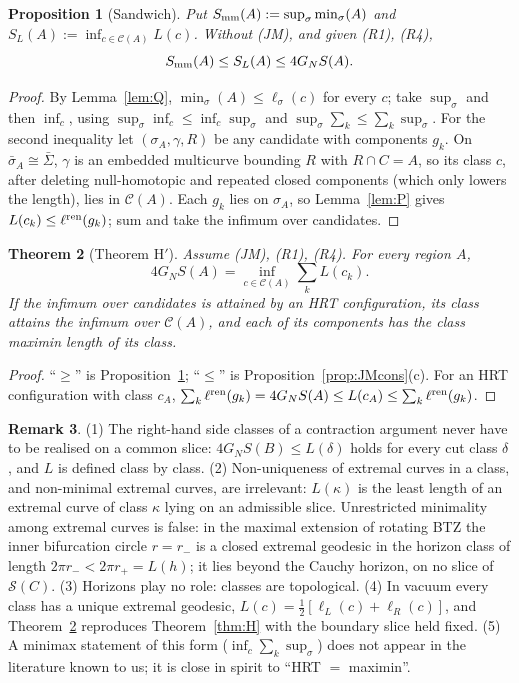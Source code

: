 \documentclass[aps,prd,onecolumn,superscriptaddress,nofootinbib,amsmath,amssymb,11pt]{revtex4-2}
\newtheorem{theorem}{Theorem}[section]
\newtheorem{proposition}[theorem]{Proposition}
\theoremstyle{definition}
\newtheorem{remark}[theorem]{Remark}
\newcommand{\Cut}{\mathcal{C}}
\begin{document}
\begin{proposition}[Sandwich]\label{prop:sandwich}
Put $S_{\rm mm}(A):=\sup_\sigma\min_\sigma(A)$ and $S_L(A):=\inf_{c\in\Cut(A)}L(c)$. Without (JM), and given (R1), (R4),
\[
S_{\rm mm}(A)\le S_L(A)\le4G_NS(A).
\]
\end{proposition}

\begin{proof}
By Lemma~\ref{lem:Q}, $\min_\sigma(A)\le\ell_\sigma(c)$ for every $c$; take $\sup_\sigma$ and then $\inf_c$, using
$\sup_\sigma\inf_c\le\inf_c\sup_\sigma$ and $\sup_\sigma\sum_k\le\sum_k\sup_\sigma$. For the second inequality let $(\sigma_A,\gamma,R)$ be
any candidate with components $g_k$. On $\bar\sigma_A\cong\bar\Sigma$, $\gamma$ is an embedded multicurve bounding $R$ with $R\cap
C=A$, so its class $c$, after deleting null-homotopic and repeated closed components (which only lowers the length), lies in
$\Cut(A)$. Each $g_k$ lies on $\sigma_A$, so Lemma~\ref{lem:P} gives $L(c_k)\le\ell^{\rm ren}(g_k)$; sum and take the infimum
over candidates.
\end{proof}

\begin{theorem}[Theorem H$'$]\label{thm:Hprime}
Assume (JM), (R1), (R4). For every region $A$,
\[
4G_NS(A)=\inf_{c\in\Cut(A)}\sum_kL(c_k).
\]
If the infimum over candidates is attained by an HRT configuration, its class attains the infimum over $\Cut(A)$, and
each of its components has the class maximin length of its class.
\end{theorem}

\begin{proof}
``$\ge$'' is Proposition~\ref{prop:sandwich}; ``$\le$'' is Proposition~\ref{prop:JMcons}(c). For an HRT configuration with
class $c_A$, $\sum_k\ell^{\rm ren}(g_k)=4G_NS(A)\le L(c_A)\le\sum_k\ell^{\rm ren}(g_k)$.
\end{proof}

\begin{remark}
(1) The right-hand side classes of a contraction argument never have to be realised on a common slice:
$4G_NS(B)\le L(\delta)$ holds for every cut class $\delta$, and $L$ is defined class by class. (2) Non-uniqueness of extremal
curves in a class, and non-minimal extremal curves, are irrelevant: $L(\kappa)$ is the least length of an extremal curve of class
$\kappa$ lying on an admissible slice. Unrestricted minimality among extremal curves is false: in the maximal extension of
rotating BTZ the inner bifurcation circle $r=r_-$ is a closed extremal geodesic in the horizon class of length
$2\pi r_-<2\pi r_+=L(h)$; it lies beyond the Cauchy horizon, on no slice of $\mathcal S(C)$. (3) Horizons play no role:
classes are topological. (4) In vacuum every class has a unique extremal geodesic, $L(c)=\frac12[\ell_L(c)+\ell_R(c)]$, and
Theorem~\ref{thm:Hprime} reproduces Theorem~\ref{thm:H} with the boundary slice held fixed. (5) A minimax statement of this
form ($\inf_c\sum_k\sup_\sigma$) does not appear in the literature known to us; it is close in spirit to ``HRT $=$ maximin''.
\end{remark}
\end{document}
